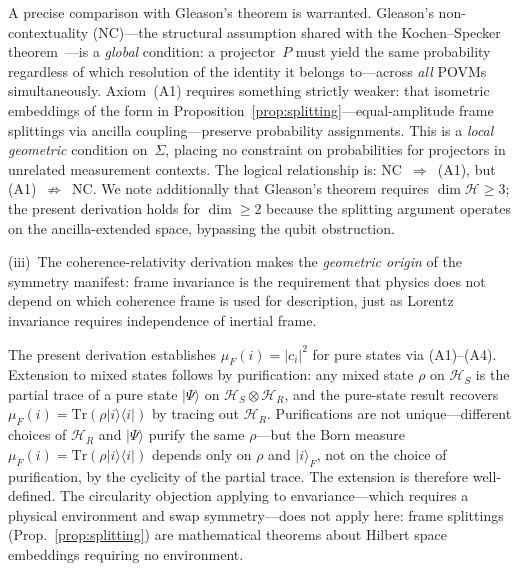 \documentclass[aps,prd,twocolumn,superscriptaddress,nofootinbib,floatfix]{revtex4-2}
\newcommand{\Sig}{\Sigma}
\begin{document}
A precise comparison with Gleason's theorem is warranted. Gleason's non-contextuality (NC)---the structural assumption shared with the Kochen--Specker theorem~\cite{kochenSpeckerProblemHiddenVariables1967}---is a \emph{global} condition: a projector~$P$ must yield the same probability regardless of which resolution of the identity it belongs to---across \emph{all} POVMs simultaneously. Axiom~(A1) requires something strictly weaker: that isometric embeddings of the form in Proposition~\ref{prop:splitting}---equal-amplitude frame splittings via ancilla coupling---preserve probability assignments. This is a \emph{local geometric} condition on~$\Sig$, placing no constraint on probabilities for projectors in unrelated measurement contexts. The logical relationship is: NC~$\Rightarrow$~(A1), but (A1)~$\not\Rightarrow$~NC. We note additionally that Gleason's theorem requires $\dim\mathcal{H} \geq 3$; the present derivation holds for $\dim \geq 2$ because the splitting argument operates on the ancilla-extended space, bypassing the qubit obstruction.

(iii)~The coherence-relativity derivation makes the \emph{geometric origin} of the symmetry manifest: frame invariance is the requirement that physics does not depend on which coherence frame is used for description, just as Lorentz invariance requires independence of inertial frame.

The present derivation establishes $\mu_F(i) = |c_i|^2$ for pure states via (A1)--(A4). Extension to mixed states follows by purification: any mixed state $\rho$ on $\mathcal{H}_S$ is the partial trace of a pure state $|\Psi\rangle$ on $\mathcal{H}_S \otimes \mathcal{H}_R$, and the pure-state result recovers $\mu_F(i) = \mathrm{Tr}(\rho|i\rangle\langle i|)$ by tracing out $\mathcal{H}_R$. Purifications are not unique---different choices of $\mathcal{H}_R$ and $|\Psi\rangle$ purify the same $\rho$---but the Born measure $\mu_F(i) = \mathrm{Tr}(\rho|i\rangle\langle i|)$ depends only on $\rho$ and $|i\rangle_F$, not on the choice of purification, by the cyclicity of the partial trace. The extension is therefore well-defined. The circularity objection applying to envariance---which requires a physical environment and swap symmetry---does not apply here: frame splittings (Prop.~\ref{prop:splitting}) are mathematical theorems about Hilbert space embeddings requiring no environment.
\end{document}
